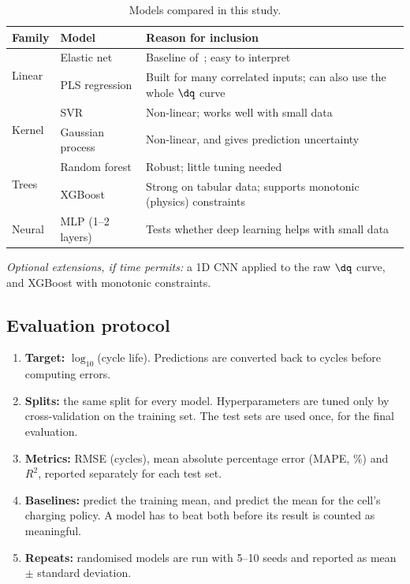 \begin{table}[t]
\centering
\caption{Models compared in this study.}
\label{tab:models}
\setlength{\tabcolsep}{3pt}
\begin{tabular}{@{}llp{}@{}}
\toprule
Family & Model & Reason for inclusion \\
\midrule
\multirow{2}{*}{Linear} & Elastic net & Baseline of~\cite{severson2019}; easy to interpret \\
 & PLS regression & Built for many correlated inputs; can also use the whole $\dq$ curve \\
\midrule
\multirow{2}{*}{Kernel} & SVR & Non-linear; works well with small data \\
 & Gaussian process & Non-linear, and gives prediction uncertainty \\
\midrule
\multirow{2}{*}{Trees} & Random forest & Robust; little tuning needed \\
 & XGBoost & Strong on tabular data; supports monotonic (physics) constraints \\
\midrule
Neural & MLP (1--2 layers) & Tests whether deep learning helps with small data \\
\bottomrule
\end{tabular}
\end{table}

\noindent\textit{Optional extensions, if time permits:} a 1D CNN applied to
the raw $\dq$ curve, and XGBoost with monotonic constraints.

\subsection{Evaluation protocol}
\begin{enumerate}
  \item \textbf{Target:} $\log_{10}$(cycle life). Predictions are converted
  back to cycles before computing errors.
  \item \textbf{Splits:} the same split for every model. Hyperparameters are
  tuned only by cross-validation on the training set. The test sets are
  used once, for the final evaluation.
  \item \textbf{Metrics:} RMSE (cycles), mean absolute percentage error
  (MAPE, \%) and $R^2$, reported separately for each test set.
  \item \textbf{Baselines:} predict the training mean, and predict the mean
  for the cell's charging policy. A model has to beat both before its
  result is counted as meaningful.
  \item \textbf{Repeats:} randomised models are run with 5--10 seeds and
  reported as mean $\pm$ standard deviation.
\end{enumerate}

